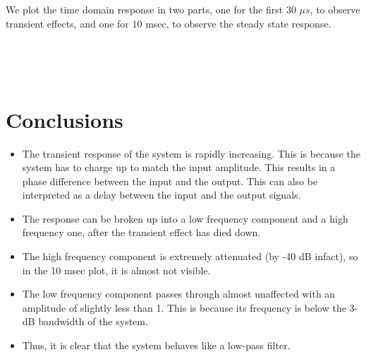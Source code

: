 \documentclass[11pt]{article}
\providecommand{\tightlist}{%
      \setlength{\itemsep}{0pt}\setlength{\parskip}{0pt}}
\begin{document}
	

	

	
		
    We plot the time domain response in two parts, one for the first 30
\(\mu s\), to observe transient effects, and one for \(10\) msec, to
observe the steady state response.

	

	

    \begin{center}
    \end{center}
    { \hspace*{\fill} \\}
    
	

    \begin{center}
    \end{center}
    { \hspace*{\fill} \\}
    
	
		
    \section{Conclusions}\label{conclusions}

\begin{itemize}
\tightlist
\item
  The transient response of the system is rapidly increasing. This is
  because the system has to charge up to match the input amplitude. This
  results in a phase difference between the input and the output. This
  can also be interpreted as a delay between the input and the output
  signals.
\item
  The response can be broken up into a low frequency component and a
  high frequency one, after the transient effect has died down.
\item
  The high frequency component is extremely attenuated (by -40 dB
  infact), so in the 10 msec plot, it is almost not visible.
\item
  The low frequency component passes through almost unaffected with an
  amplitude of slightly less than 1. This is because its frequency is
  below the 3-dB bandwidth of the system.
\item
  Thus, it is clear that the system behaves like a low-pass filter.
\end{itemize}

	


    
    
    
    
\end{document}
